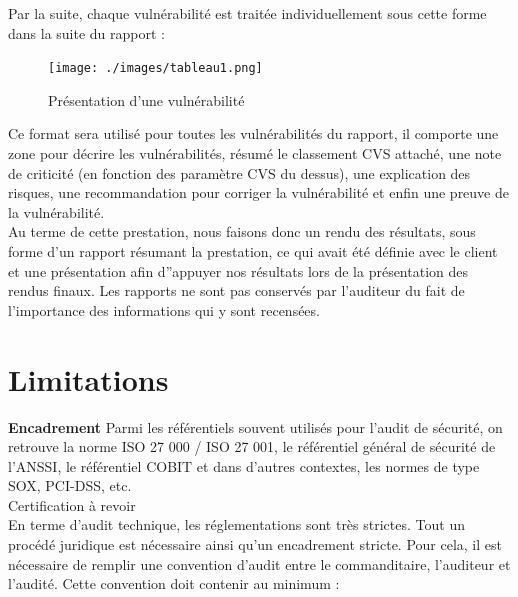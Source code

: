\documentclass[a4paper]{memoir}
\begin{document}
Par la suite, chaque vulnérabilité est traitée individuellement sous cette forme dans la suite du rapport : 

\begin{figure}[!ht]
    \center
    \texttt{[image: ./images/tableau1.png]}
    \caption{Présentation d'une vulnérabilité}
    \label{ID}
\end{figure}

Ce format sera utilisé pour toutes les vulnérabilités du rapport, il comporte une zone pour décrire les vulnérabilités, résumé le classement CVS attaché, une note de criticité (en fonction des paramètre CVS du dessus), une explication des risques, une recommandation pour corriger la vulnérabilité et enfin une preuve de la vulnérabilité.\\

Au terme de cette prestation, nous faisons donc un rendu des résultats, sous forme d'un rapport résumant la prestation, ce qui avait été définie avec le client et une présentation afin d''appuyer nos résultats lors de la présentation des rendus finaux.
Les rapports ne sont pas conservés par l'auditeur du fait de l'importance des informations qui y sont recensées.

\chapter{Limitations}

\textbf{Encadrement}
Parmi les référentiels souvent utilisés pour l’audit de sécurité, on retrouve la norme ISO 27 000 / ISO 27 001, le référentiel général de sécurité de l’ANSSI, le référentiel COBIT et dans d’autres contextes, les normes de type SOX, PCI-DSS, etc.\\

Certification à revoir\\

En terme d'audit technique, les réglementations sont très strictes. Tout un procédé juridique est nécessaire ainsi qu'un encadrement stricte. Pour cela, il est nécessaire de remplir une convention d'audit entre le commanditaire, l'auditeur et l'audité. Cette convention doit contenir au minimum : 
\end{document}
